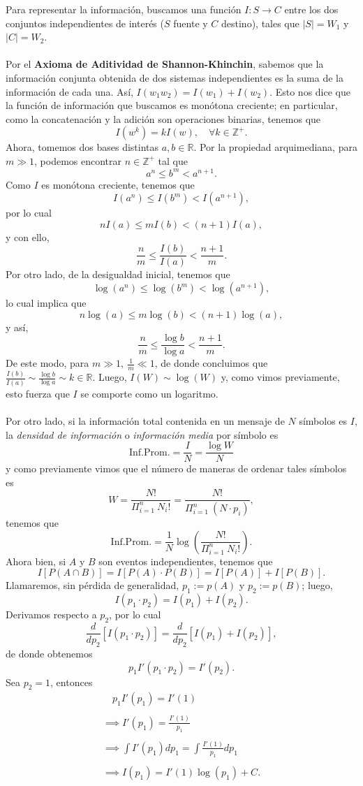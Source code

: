 \documentclass{article}
\begin{document}
Para representar la información, buscamos una función $I: S \longrightarrow C $ entre los dos conjuntos independientes de interés ($S$ fuente y $C$ destino), tales que $|S| = W_1$ y $|C| = W_2$. \\ \\ Por el \textbf{Axioma de Aditividad de Shannon-Khinchin}, sabemos que la información conjunta obtenida de dos sistemas independientes es la suma de la información de cada una. Así, $I(w_1 w_2) = I(w_1) + I(w_2)$. Esto nos dice que la función de información que buscamos es monótona creciente; en particular, como la concatenación y la adición son operaciones binarias, tenemos que  \[ I(w^k) = kI(w), \quad \forall k \in \mathbb{Z}^+.\]
Ahora, tomemos dos bases distintas $a,b \in \mathbb{R}$. Por la propiedad arquimediana, para $m \gg 1$, podemos encontrar $n \in \mathbb{Z}^+$ tal que \[a^n \leq b^m < a^{n+1}.\]
Como $I$ es monótona creciente, tenemos que \[I(a^n) \leq I(b^m) < I(a^{n+1}),\] por lo cual \[nI(a) \leq mI(b) < (n+1) I(a),\] y con ello, \[\frac{n}{m} \leq \frac{I(b)}{I(a)} < \frac{n+1}{m}.\]
Por otro lado, de la desigualdad inicial, tenemos que \[\log (a^n) \leq  \log (b^m)< \log (a^{n+1}),\] lo cual implica que \[n \log (a) \leq m \log(b) < (n+1) \log(a),\] y así, \[\frac{n}{m} \leq \frac{\log b}{\log a} < \frac{n+1}{m}.\]
De este modo, para $m \gg 1, \ \frac{1}{m} \ll 1$, de donde concluimos que $\frac{I(b)}{I(a)} \sim \frac{\log b}{\log a} \sim k \in \mathbb{R}$. Luego, $I(W) \sim \log(W)$ y, como vimos previamente, esto fuerza que $I$ se comporte como un logaritmo. \\ \\
Por otro lado, si la información total contenida en un mensaje de $N$ símbolos es $I$, la \textit{densidad de información} o \textit{información media} por símbolo es \[ \text{Inf.Prom.} = \frac{I}{N} = \frac{\log W}{N} \] y como previamente vimos que el número de maneras de ordenar tales símbolos es \[W = \frac{N!}{\Pi_{i=1}^n \ N_i!} = \frac{N!}{\Pi_{i=1}^n \ (N \cdot p_i)},\] tenemos que \[\text{Inf.Prom.} = \frac{1}{N} \log \left( \frac{N!}{\Pi_{i=1}^n \ N_i!} \right). \]
Ahora bien, si $A$ y $B$ son eventos independientes, tenemos que \[I[P(A \cap B)] = I[P(A) \cdot P(B)] = I[P(A)] + I[P(B)].\] Llamaremos, sin pérdida de generalidad, $p_1:= p(A)$ y $p_2:= p(B)$; luego, \[I(p_1 \cdot p_2) = I(p_1) + I(p_2).\] Derivamos respecto a $p_2$, por lo cual \[\frac{d}{dp_2} [ I(p_1 \cdot p_2)] = \frac{d}{dp_2} [ I(p_1) + I(p_2)],\] de donde obtenemos \[p_1 I'(p_1\cdot p_2) = I'(p_2).\]
Sea $p_2 = 1$, entonces
\begin{align*}
    & \quad p_1  I'(p_1) = I'(1) &\\ \\
    & \implies I'(p_1) = \frac{I'(1)}{p_1} &\\ \\
    &  \implies \int I'(p_1) d p_1 = \int \frac{I'(1)}{p_1} dp_1 &\\ \\
    & \implies I(p_1) = I'(1) \log (p_1) + C.
\end{align*}
\end{document}
